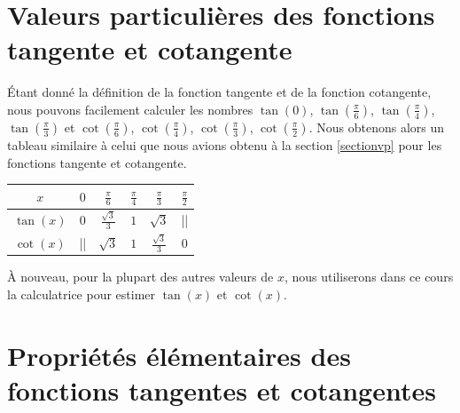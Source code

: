 \documentclass[a4paper,fontsize=13pt]{scrreprt}
\theoremstyle{plain}
\theoremstyle{definition}
\begin{document}
\section{Valeurs particulières des fonctions tangente et cotangente} \label{sectionvptc}

\'Etant donné la définition de la fonction tangente et de la fonction cotangente, nous pouvons facilement calculer les nombres $\tan(0)$, $\tan(\frac{\pi}{6})$, $\tan(\frac{\pi}{4})$, $\tan(\frac{\pi}{3})$ et $\cot(\frac{\pi}{6})$, $\cot(\frac{\pi}{4})$, $\cot(\frac{\pi}{3})$, $\cot(\frac{\pi}{2})$. Nous obtenons alors un tableau similaire à celui que nous avions obtenu à la section \ref{sectionvp} pour les fonctions tangente et cotangente.
\begin{center}
\begin{Large}
\begin{tabular}{|c|c|c|c|c|c|}
  \hline
  $x$ & $0$ & $\frac{\pi}{6}$ & $\frac{\pi}{4}$ & $\frac{\pi}{3}$ & $\frac{\pi}{2}$\\
  \hline
  $\tan(x)$ & $0$ & $\frac{\sqrt{3}}{3}$ & $1$ & $\sqrt{3}$ & || \\
  \hline
  $\cot(x)$ & || & $\sqrt{3}$ & $1$ & $\frac{\sqrt{3}}{3}$ & $0$ \\
  \hline
\end{tabular}
\end{Large}
\end{center}
À nouveau, pour la plupart des autres valeurs de $x$, nous utiliserons dans ce cours la calculatrice pour estimer $\tan(x)$ et $\cot(x)$.

\section{Propriétés élémentaires des fonctions tangentes et cotangentes}
\end{document}
